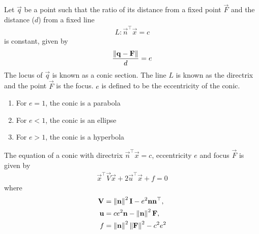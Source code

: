 \documentclass[journal,12pt,onecolumn]{IEEEtran}
\begin{document}
\begin{definition}
  Let $\vec{q}$ be a point such that the ratio of its distance from a fixed point $\vec{F}$ and the distance ($d$) from a fixed line 
	\begin{align}
L: \vec{n}^{\top}\vec{x}=c 
	\end{align}
		is constant, given by 
\label{conics/30/def}
\begin{align}
\frac{\left\lVert\mathbf{q}-\mathbf{F}\right\rVert}{d} = e    
\end{align}
The locus of $\vec{q}$ is known as a conic section. The line $L$ is known as the directrix and the point $\vec{F}$ is the focus. $e$ is defined to be 
the eccentricity of the conic.  
\begin{enumerate}
    \item For $e = 1$, the conic is a parabola
    \item For $e < 1$, the conic is an ellipse
    \item For $e > 1$, the conic is a hyperbola
\end{enumerate}
\end{definition}
\begin{theorem}
The equation of  a conic with directrix $\vec{n}^{\top}\vec{x} = c$, eccentricity $e$ and focus $\vec{F}$ is given by 
\begin{align}
    \label{eq:conic_quad_form}
    \vec{x}^{\top}\vec{V}\vec{x}+2\vec{u}^{\top}\vec{x}+f=0
    \end{align}
where     
\begin{align}
  \label{eq:conic_quad_form_v}
\mathbf{V} &=\left\lVert\mathbf{n}\right\rVert^2\mathbf{I}-e^2\mathbf{n}\mathbf{n}^{\top}, 
\\
\label{eq:conic_quad_form_u}
\mathbf{u} &= ce^2\mathbf{n}-\left\lVert\mathbf{n}\right\rVert^2\mathbf{F}, 
\\
\label{eq:conic_quad_form_f}
f &= \left\lVert\mathbf{n}\right\rVert^2\left\lVert\mathbf{F}\right\rVert^2-c^2e^2
    \end{align}
    
%
\end{theorem}
\end{document}
